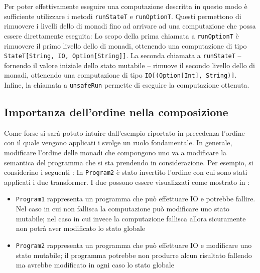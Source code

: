 Per poter effettivamente eseguire una computazione descritta in questo modo è sufficiente utilizzare i metodi \lstinline{runStateT} e \lstinline{runOptionT}. Questi permettono di rimuovere i livelli dello  di monadi fino ad arrivare ad una computazione che possa essere direttamente eseguita:
Lo scopo della prima chiamata a \lstinline{runOptionT} è rimuovere il primo livello dello  di monadi, ottenendo una computazione di tipo \lstinline{StateT[String, IO, Option[String]]}. La seconda chiamata a \lstinline{runStateT} -- fornendo il valore iniziale dello stato mutabile -- rimuove il secondo livello dello  di monadi, ottenendo una computazione di tipo \lstinline{IO[(Option[Int], String)]}. Infine, la chiamata a \lstinline{unsafeRun} permette di eseguire la computazione ottenuta.

\subsection{Importanza dell'ordine nella composizione}
Come forse si sarà potuto intuire dall'esempio riportato in precedenza l'ordine con il quale vengono applicati i  svolge un ruolo fondamentale. In generale, modificare l'ordine delle monadi che compongono uno  va a modificare la semantica del programma che si sta prendendo in considerazione. Per esempio, si considerino i seguenti :
In \lstinline{Program2} è stato invertito l'ordine con cui sono stati applicati i due transformer. I due  possono essere visualizzati come mostrato in :
\begin{itemize}
  \item \lstinline{Program1} rappresenta un programma che può effettuare IO e potrebbe fallire. Nel caso in cui non fallisca la computazione può modificare uno stato mutabile; nel caso in cui invece la computazione fallisca allora sicuramente non potrà aver modificato lo stato globale
  \item \lstinline{Program2} rappresenta un programma che può effettuare IO e modificare uno stato mutabile; il programma potrebbe non produrre alcun risultato fallendo ma avrebbe modificato in ogni caso lo stato globale
\end{itemize}




